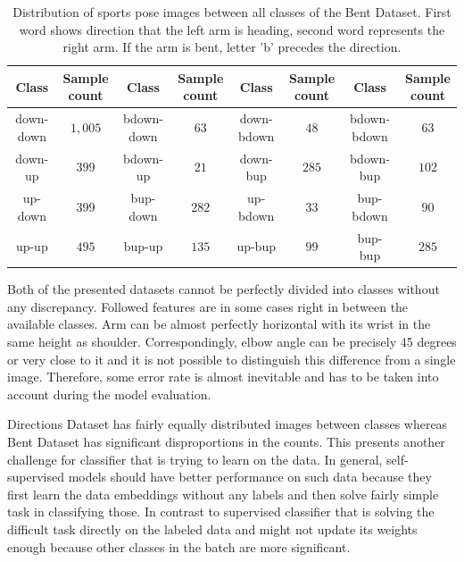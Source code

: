 \begin{table}[!ht]
    \footnotesize
    \begin{center}
        \begin{tabular}{ |c|c||c|c||c|c||c|c| }
            \hline
                Class & \makecell{Sample \\ count} & Class & \makecell{Sample \\ count} & Class & \makecell{Sample \\ count} & Class & \makecell{Sample \\ count} \\
            \hline
            \hline
            down-down & $1,005$ & bdown-down & $63$ & down-bdown & $48$ & bdown-bdown & $63$ \\
            \hline
            down-up & $399$ & bdown-up & $21$ & down-bup & $285$ & bdown-bup & $102$ \\
            \hline
            up-down & $399$ & bup-down & $282$ & up-bdown & $33$ & bup-bdown & $90$ \\
            \hline
            up-up & $495$ & bup-up & $135$ & up-bup & $99$ & bup-bup & $285$ \\
            \hline
        \end{tabular}
    \end{center}
    \caption{Distribution of sports pose images between all classes of the Bent Dataset. First word shows direction that the left arm is heading, second word represents the right arm. If the arm is bent, letter 'b' precedes the direction.}
    \label{tab:bent-dataset-counts}
\end{table}

Both of the presented datasets cannot be perfectly divided into classes without any discrepancy. Followed features are in some cases right in between the available classes. Arm can be almost perfectly horizontal with its wrist in the same height as shoulder. Correspondingly, elbow angle can be precisely 45 degrees or very close to it and it is not possible to distinguish this difference from a single image. Therefore, some error rate is almost inevitable and has to be taken into account during the model evaluation.

Directions Dataset has fairly equally distributed images between classes whereas Bent Dataset has significant disproportions in the counts. This presents another challenge for classifier that is trying to learn on the data. In general, self-supervised models should have better performance on such data because they first learn the data embeddings without any labels and then solve fairly simple task in classifying those. In contrast to supervised classifier that is solving the difficult task directly on the labeled data and might not update its weights enough because other classes in the batch are more significant.

